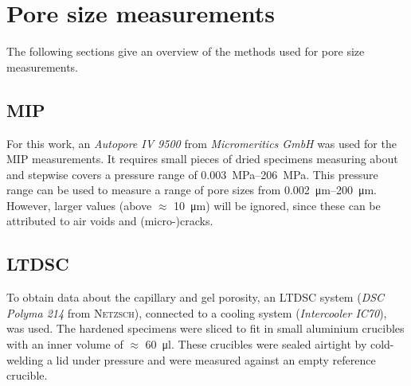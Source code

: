 \FloatBarrier
\section{Pore size measurements}
\label{sec:methods_pore_analysis}

The following sections give an overview of the methods used for pore size measurements.

\FloatBarrier
\subsection[Mercury intrusion porosimetry]{\Acl*{MIP}}
\label{sec:method-mip}

For this work, an \textit{Autopore IV 9500} from \textit{Micromeritics GmbH} was used for the \ac{MIP} measurements.
It requires small pieces of dried specimens measuring about  and stepwise covers a pressure range of \qtyrange{0.003}{206}{\mega\pascal}.
This pressure range can be used to measure a range of pore sizes from \qtyrange{0.002}{200}{\micro\meter}.
However, larger values (above $\approx$ \qty{10}{\micro\meter}) will be ignored, since these can be attributed to air voids and (micro-)cracks. %


\FloatBarrier
\subsection[Low temperature - differential scanning calorimetry]{\Acl*{LTDSC}}
\label{fig:ltdsc}

To obtain data about the capillary and gel porosity, an \ac{LTDSC} system (\textit{DSC Polyma 214} from \textsc{Netzsch}), connected to a cooling system (\textit{Intercooler IC70}), was used.
The hardened specimens were sliced to fit in small aluminium crucibles with an inner volume of $\approx$ \qty{60}{\micro\litre}.
These crucibles were sealed airtight by cold-welding a lid under pressure and were measured against an empty reference crucible.

